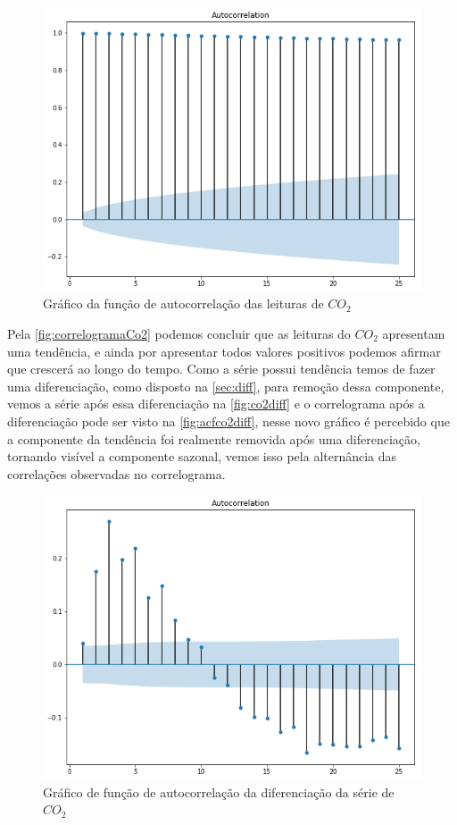 \documentclass[
    12pt,
    oneside,
    a4paper,
    english,
    brazil
]{abntex2}
\begin{document}
\begin{figure}
    \centering
    \caption{Gráfico da função de autocorrelação das leituras de
        $CO_2$}\label{fig:correlogramaCo2}
    \includegraphics[width=.6\linewidth]{images/acf_co2.png}
\end{figure}

Pela \autoref{fig:correlogramaCo2} podemos concluir que as leituras do $CO_2$
apresentam uma tendência, e ainda por apresentar todos valores positivos
podemos afirmar que crescerá ao longo do tempo. Como a série possui tendência
temos de fazer uma diferenciação, como disposto na \autoref{sec:diff}, para
remoção dessa componente, vemos a série após essa diferenciação na
\autoref{fig:co2diff} e o correlograma após a diferenciação pode ser visto na
\autoref{fig:acfco2diff}, nesse novo gráfico é percebido que a componente da
tendência foi realmente removida após uma diferenciação, tornando visível a
componente sazonal, vemos isso pela alternância das correlações observadas no
correlograma.

\begin{figure}
    \centering
    \caption{Gráfico de função de autocorrelação da diferenciação da série de
        $CO_2$}\label{fig:acfco2diff}
    \includegraphics[width=.6\linewidth]{images/acf_co2_diff.png}
\end{figure}
\end{document}
